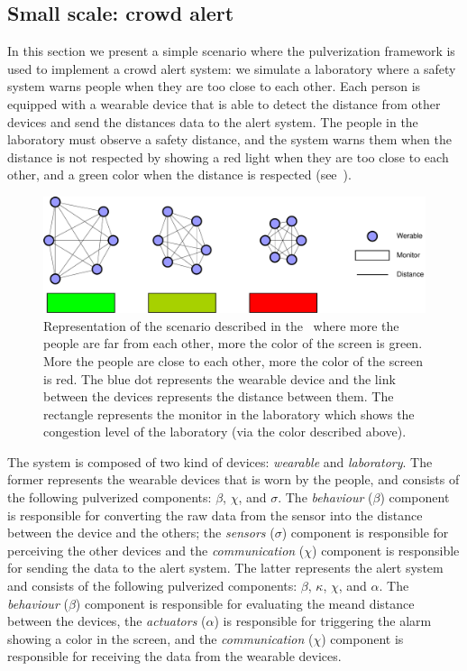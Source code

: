 \documentclass[conference]{IEEEtran}
\begin{document}
\subsection{Small scale: crowd alert}
\label{sec:small-scale-crowd-alert}

In this section we present a simple scenario where the pulverization framework is used to implement a crowd alert system:
we simulate a laboratory where a safety system warns people when they are too close to each other.
%
Each person is equipped with a wearable device that is able to detect the distance from other devices and send the distances data to the
alert system.
%
The people in the laboratory must observe a safety distance, and the system warns them when the distance is not respected by showing a red light
when they are too close to each other, and a green color when the distance is respected (see~).
%
\begin{figure}[ht]
    \centering
    \includegraphics[width=.8\textwidth]{figures/crow-laboratory-demo.drawio.pdf}
    \caption{
        Representation of the scenario described in the~
        where more the people are far from each other, more the color of the screen is green.
        More the people are close to each other, more the color of the screen is red.
        The blue dot represents the wearable device and the link between the devices represents the distance between them.
        The rectangle represents the monitor in the laboratory which shows the congestion level of the laboratory (via the color described above).
    }
    \label{fig:crowd-alert}
\end{figure}
%
The system is composed of two kind of devices: \emph{wearable} and \emph{laboratory}.
%
The former represents the wearable devices that is worn by the people, and consists of the following pulverized components:
$\beta$, $\chi$, and $\sigma$.
%
The \emph{behaviour} ($\beta$) component is responsible for converting the raw data from the sensor into the distance
between the device and the others; the \emph{sensors} ($\sigma$) component is responsible for perceiving the other devices and
the \emph{communication} ($\chi$) component is responsible for sending the data to the alert system.
%
The latter represents the alert system and consists of the following pulverized components:
$\beta$, $\kappa$, $\chi$, and $\alpha$.
%
The \emph{behaviour} ($\beta$) component is responsible for evaluating the meand distance between the devices,
the \emph{actuators} ($\alpha$) is responsible for triggering the alarm showing a color in the screen,
and the \emph{communication} ($\chi$) component is responsible for receiving the data from the wearable devices.
\end{document}
